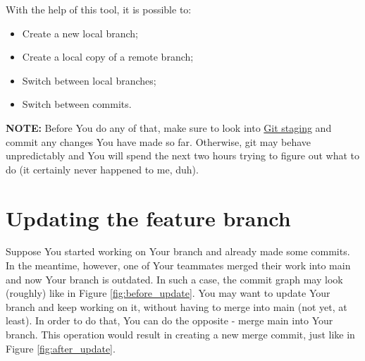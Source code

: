 \documentclass{article}
\begin{document}
With the help of this tool, it is possible to:

\begin{itemize}
    \item Create a new local branch;
    \item Create a local copy of a remote branch;
    \item Switch between local branches;
    \item Switch between commits.
\end{itemize}

\textbf{NOTE: } Before You do any of that, make sure to look into \hyperref[sec:git_staging]{Git staging} and commit any changes You have made so far. Otherwise, git may behave unpredictably and You will spend the next two hours trying to figure out what to do (it certainly never happened to me, duh). 

\section{Updating the feature branch}

Suppose You started working on Your branch and already made some commits. In the meantime, however, one of Your teammates merged their work into main and now Your branch is outdated. In such a case, the commit graph may look (roughly) like in Figure \ref{fig:before_update}. You may want to update Your branch and keep working on it, without having to merge into main (not yet, at least). In order to do that, You can do the opposite - merge main into Your branch. This operation would result in creating a new merge commit, just like in Figure \ref{fig:after_update}.\newline
\end{document}
